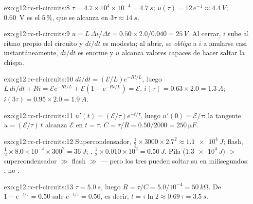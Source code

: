 \begin{solution}{exo:g12:rc-rl-circuits:8}
$\tau = 4.7\times10^{4} \times 10^{-4} = \qty{4.7}{s}$;
$u(\tau) = 12\,e^{-1} \approx \qty{4.4}{V}$; \qty{0.60}{V} es el
$5\,\%$, que se alcanza en $3\tau \approx \qty{14}{s}$.
\end{solution}

\begin{solution}{exo:g12:rc-rl-circuits:9}
$u = L\,\Delta i/\Delta t = 0.50 \times 2.0/0.040 = \qty{25}{V}$. Al
cerrar, $i$ sube al ritmo propio del circuito y $di/dt$ es modesta; al
abrir, se \emph{obliga} a $i$ a anularse casi instantáneamente, $di/dt$
es enorme y $u$ alcanza valores capaces de hacer saltar la chispa.
\end{solution}

\begin{solution}{exo:g12:rc-rl-circuits:10}
$di/dt = (\mathcal{E}/L)e^{-Rt/L}$, luego
$L\,di/dt + Ri = \mathcal{E}e^{-Rt/L} + \mathcal{E}(1 - e^{-Rt/L}) =
\mathcal{E}$. $i(\tau) = 0.63 \times 2.0 = \qty{1.3}{A}$;
$i(3\tau) = 0.95 \times 2.0 = \qty{1.9}{A}$.
\end{solution}

\begin{solution}{exo:g12:rc-rl-circuits:11}
$u'(t) = (\mathcal{E}/\tau)e^{-t/\tau}$, luego
$u'(0) = \mathcal{E}/\tau$: la tangente $u = (\mathcal{E}/\tau)\,t$
alcanza $\mathcal{E}$ en $t = \tau$.
$C = \tau/R = 0.50/2000 = \qty{250}{\micro F}$.
\end{solution}

\begin{solution}{exo:g12:rc-rl-circuits:12}
Supercondensador,
$\tfrac12 \times 3000 \times 2.7^2 \approx \qty{1.1e4}{J}$; flash,
$\tfrac12 \times 8.0\times10^{-4} \times 300^2 = \qty{36}{J}$; ,
$\tfrac12 \times 0.010 \times 10^2 = \qty{0.50}{J}$. Pila
($\qty{1.3e4}{J}$) $>$ supercondensador $\gg$ flash $\gg$  ---
pero los tres pueden soltar su  en milisegundos: , no
.
\end{solution}

\begin{solution}{exo:g12:rc-rl-circuits:13}
$\tau = \qty{5.0}{s}$, luego
$R = \tau/C = 5.0/10^{-4} = \qty{50}{k\ohm}$. De
$1 - e^{-t/\tau} = 0.50$ sale $e^{-t/\tau} = 0.50$, es decir,
$t = \tau\ln 2 \approx 0.69\,\tau = \qty{3.5}{s}$.
\end{solution}


